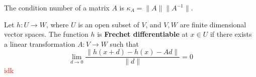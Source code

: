 \begin{definition}
  The condition number of a matrix $A$ is $\kappa_A = \|A \| \| A^{-1} \|$.
\end{definition}
\begin{definition}
  Let $h: U \to W$, where $U$ is an open subset of $V$, and $V,W$ are finite dimensional vector spaces. The function $h$ is \textbf{Frechet differentiable} at $x \in U$ if there exists a linear transformation $A: V \to W$ such that
  $$\lim_{d \rightarrow 0} \frac{\|h(x + d) - h(x) - Ad \|}{\|d\|} = 0$$
  \textcolor{red}{idk}
\end{definition}

